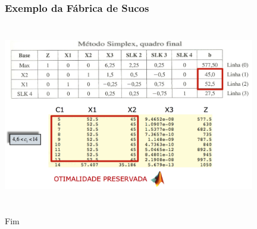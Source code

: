 \documentclass{beamer}
\begin{document}
\begin{frame}
	\frametitle{Exemplo da Fábrica de Sucos}
	\includegraphics[width=11cm,height=8cm]{Sensib_7.png}
\end{frame}

\begin{frame}
\Huge{\centerline{Fim}}
\end{frame}

\end{document}
